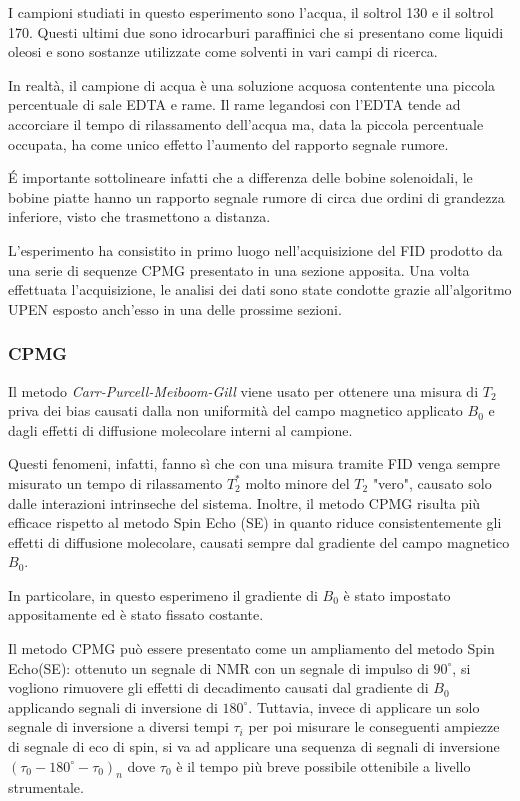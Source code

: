 I campioni studiati in questo esperimento sono l'acqua, il soltrol 130 e il soltrol 170.
Questi ultimi due sono idrocarburi paraffinici che si presentano come liquidi oleosi e sono sostanze utilizzate come solventi in vari campi di ricerca.

In realtà, il campione di acqua è una soluzione acquosa contentente una piccola percentuale di sale EDTA e rame.
Il rame legandosi con l'EDTA tende ad accorciare il tempo di rilassamento dell'acqua ma, data la piccola percentuale occupata, ha come unico effetto l'aumento del rapporto segnale rumore.

\'E importante sottolineare infatti che a differenza delle bobine solenoidali, le bobine piatte hanno un rapporto segnale rumore di circa due ordini di grandezza inferiore, visto che trasmettono a distanza.

L'esperimento ha consistito in primo luogo nell'acquisizione del FID prodotto da una serie di sequenze CPMG presentato in una sezione apposita.
Una volta effettuata l'acquisizione, le analisi dei dati sono state condotte grazie all'algoritmo UPEN esposto anch'esso in una delle prossime sezioni.

\subsubsection*{CPMG}
Il metodo \textit{Carr-Purcell-Meiboom-Gill} viene usato per ottenere una misura di $T_2$ priva dei bias causati dalla non uniformità del campo magnetico applicato $B_0$ e dagli effetti di diffusione molecolare interni al campione.

Questi fenomeni, infatti, fanno sì che con una misura tramite FID venga sempre misurato un tempo di rilassamento $T_2^*$ molto minore del $T_2$ "vero", causato solo dalle interazioni intrinseche del sistema. Inoltre, il metodo CPMG risulta più efficace rispetto al metodo Spin Echo (SE) in quanto riduce consistentemente gli effetti di diffusione molecolare, causati sempre dal gradiente del campo magnetico $B_0$.

In particolare, in questo esperimeno il gradiente di $B_0$ è stato impostato appositamente ed è stato fissato costante.

Il metodo CPMG può essere presentato come un ampliamento del metodo Spin Echo(SE): ottenuto un segnale di NMR con un segnale di impulso di $90^\circ$, si vogliono rimuovere gli effetti di decadimento causati dal gradiente di $B_0$ applicando segnali di inversione di $180^\circ$. Tuttavia, invece di applicare un solo segnale di inversione a diversi tempi $\tau_i$ per poi misurare le conseguenti ampiezze di segnale di eco di spin, si va ad applicare una sequenza di segnali di inversione $(\tau_0 - 180^\circ - \tau_0)_n$ dove $\tau_0$ è il tempo più breve possibile ottenibile a livello strumentale.\\


